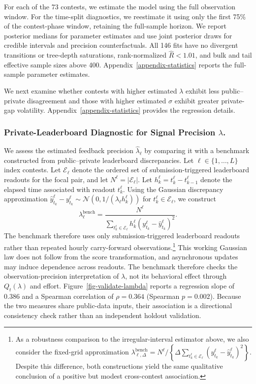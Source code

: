 \documentclass[mnsc]{informs3}
\begin{document}
For each of the 73 contests, we estimate the model using the full observation window. For the time-split diagnostics, we reestimate it using only the first 75\% of the contest-phase window, retaining the full-sample horizon. We report posterior medians for parameter estimates and use joint posterior draws for credible intervals and precision counterfactuals. All 146 fits have no divergent transitions or tree-depth saturations, rank-normalized $\widehat R<1.01$, and bulk and tail effective sample sizes above 400. Appendix~\ref{appendix-statistics} reports the full-sample parameter estimates.

{We next examine whether contests with higher estimated $\lambda$ exhibit less public--private disagreement and those with higher estimated $\sigma$ exhibit greater private-gap volatility. Appendix~\ref{appendix-statistics} provides the regression details.}

\subsubsection{Private-Leaderboard Diagnostic for Signal Precision $\lambda$.}
{We assess the estimated feedback precision $\hat\lambda_\ell$ by comparing it with a benchmark constructed from public--private leaderboard discrepancies.}
Let $\ell\in\{1,\ldots,L\}$ index contests.
Let $\mathcal E_\ell$ denote the ordered set of submission-triggered leaderboard readouts for the focal pair, and let $N^\ell=|\mathcal E_\ell|$.
Let $h_k^\ell=t_k^\ell-t_{k-1}^\ell$ denote the elapsed time associated with readout $t_k^\ell$.
{Using the Gaussian discrepancy approximation $\hat y_{t_k}^\ell-y_{t_k}^\ell\sim\mathcal N\!\left(0,1/(\lambda_\ell h_k^\ell)\right)$ for $t_k^\ell\in\mathcal E_\ell$, we construct}
\begin{equation*}
\lambda^{\text{bench}}_\ell =
\frac{N^\ell}
{\sum_{t_k^\ell\in\mathcal E_\ell}
h_k^\ell (y_{t_k}^\ell - \hat{y}_{t_k}^\ell)^2}.
\end{equation*}
The benchmark therefore uses only submission-triggered leaderboard readouts rather than repeated hourly carry-forward observations.\footnote{
As a robustness comparison to the irregular-interval estimator above, we also consider the fixed-grid approximation $\lambda_{\ell,\Delta}^{\mathrm{bench}}=N^\ell/\left\{\Delta\sum_{t_k^\ell\in\mathcal E_\ell}(y_{t_k}^\ell-\hat y_{t_k}^\ell)^2\right\}$. 
Despite this difference, both constructions yield the same qualitative conclusion of a positive but modest cross-contest association.
}
{This working Gaussian law does not follow from the score transformation, and asynchronous updates may induce dependence across readouts. The benchmark therefore checks the observation-precision interpretation of $\lambda$, not its behavioral effect through $Q_t(\lambda)$ and effort.}
Figure~\ref{fig-validate-lambda} reports a regression slope of $0.386$ and a Spearman correlation of $\rho=0.364$ (Spearman $p=0.002$). Because the two measures share public-data inputs, their association is a directional consistency check rather than an independent holdout validation.
\end{document}
